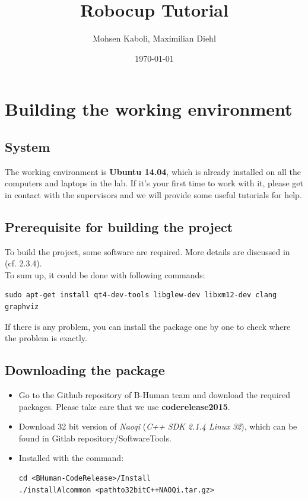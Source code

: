 \documentclass[a4paper]{article}
\title{Robocup Tutorial}
\author{Mohsen Kaboli, Maximilian Diehl}
\date{\today}
\begin{document}
\maketitle

\section{Building the working environment}

\subsection{System}
The working environment is \textbf{Ubuntu 14.04}, which is already installed on all the computers and laptops in the lab. If it's your first time to work with it, please get in contact with the supervisors and we will provide some useful tutorials for help.

\subsection{Prerequisite for building the project}
To build the project, some software are required. More details are discussed in \cite{BHuman2015}(cf. 2.3.4).\\
To sum up, it could be done with following commands:
\begin{lstlisting}
sudo apt-get install qt4-dev-tools libglew-dev libxm12-dev clang graphviz
\end{lstlisting}
If there is any problem, you can install the package one by one to check where the problem is exactly.
\subsection{Downloading the package}
\begin{itemize}
\item Go to the Github repository of B-Human team and download the required packages. 
Please take care that we use \textbf{coderelease2015}. 
\item Download 32 bit version of \textsl{Naoqi} (\textsl{C++ SDK 2.1.4 Linux 32}), which can be found in Gitlab repository/SoftwareTools.
\item Installed with the command:
\begin{lstlisting}
cd <BHuman-CodeRelease>/Install
./installAlcommon <pathto32bitC++NAOQi.tar.gz>
\end{lstlisting}
\end{itemize}
\end{document}
